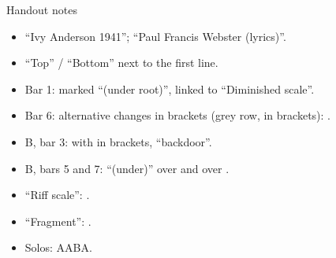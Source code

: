 \begin{study}{Handout notes}
\begin{itemize}\setlength{\itemsep}{0pt}
\item ``Ivy Anderson 1941''; ``Paul Francis Webster (lyrics)''.
\item ``Top'' / ``Bottom'' next to the first line.
\item Bar 1:  marked ``(under root)'', linked to ``Diminished scale''.
\item Bar 6: alternative changes in brackets (grey row, in brackets):    .
\item B, bar 3:  with  in brackets, ``backdoor''.
\item B, bars 5 and 7: ``(under)'' over  and over .
\item ``Riff scale'': .
\item ``Fragment'': .
\item Solos: AABA.
\end{itemize}
\end{study}
